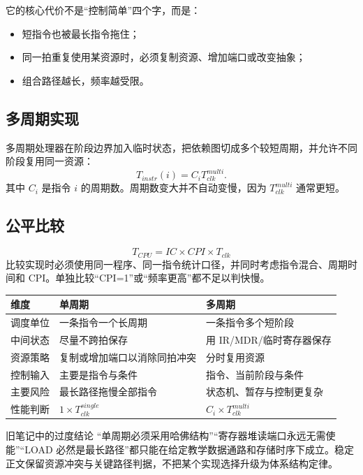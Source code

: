 \documentclass[UTF8,fontset=fandol,11pt,a4paper]{ctexart}
\begin{document}
它的核心代价不是“控制简单”四个字，而是：
\begin{itemize}
  \item 短指令也被最长指令拖住；
  \item 同一拍重复使用某资源时，必须复制资源、增加端口或改变抽象；
  \item 组合路径越长，频率越受限。
\end{itemize}

\subsection{多周期实现}

多周期处理器在阶段边界加入临时状态，把依赖图切成多个较短周期，并允许不同阶段复用同一资源：
\[
T_{instr}(i)=C_iT_{clk}^{multi}.
\]
其中 $C_i$ 是指令 $i$ 的周期数。周期数变大并不自动变慢，因为 $T_{clk}^{multi}$ 通常更短。

\subsection{公平比较}

\[
\boxed{T_{CPU}=IC\times CPI\times T_{clk}}
\]
比较实现时必须使用同一程序、同一指令统计口径，并同时考虑指令混合、周期时间和 CPI。单独比较“CPI=1”或“频率更高”都不足以判快慢。

\begin{center}
\small
\begin{tabularx}{\linewidth}{L{2.5cm}YY}
\toprule
维度 & 单周期 & 多周期 \\
\midrule
调度单位 & 一条指令一个长周期 & 一条指令多个短阶段 \\
中间状态 & 尽量不跨拍保存 & 用 IR/MDR/临时寄存器保存 \\
资源策略 & 复制或增加端口以消除同拍冲突 & 分时复用资源 \\
控制输入 & 主要是指令与条件 & 指令、当前阶段与条件 \\
主要风险 & 最长路径拖慢全部指令 & 状态机、暂存与控制更复杂 \\
性能判断 & $1\times T_{clk}^{single}$ & $C_i\times T_{clk}^{multi}$ \\
\bottomrule
\end{tabularx}
\end{center}

\begin{warnbox}{旧笔记中的过度结论}
“单周期必须采用哈佛结构”“寄存器堆读端口永远无需使能”“LOAD 必然是最长路径”都只能在给定教学数据通路和存储时序下成立。稳定正文保留资源冲突与关键路径判据，不把某个实现选择升级为体系结构定律。
\end{warnbox}
\end{document}
